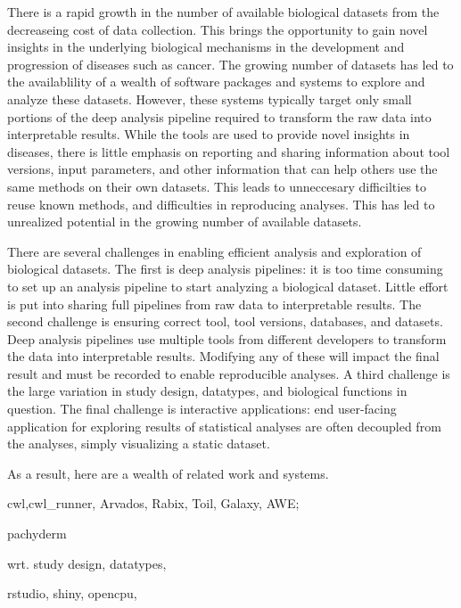 
There is a rapid growth in the number of available biological datasets from the
decreaseing cost of data collection. This brings the opportunity to gain novel
insights in the underlying biological mechanisms in the development and
progression of diseases such as cancer. The growing number of datasets has led
to the availablility of a wealth of software packages and systems to explore and
analyze these datasets. However, these systems typically target only small
portions of the deep analysis pipeline required to transform the raw data into
interpretable results. While the tools are used to provide novel insights in
diseases, there is little emphasis on reporting and sharing information about
tool versions, input parameters, and other information that can help others use
the same methods on their own datasets. This leads to unneccesary difficilties
to reuse known methods, and difficulties in reproducing analyses.  This has led
to unrealized potential in the growing number of available datasets. 


There are several challenges in enabling efficient analysis and exploration of
biological datasets. 
The first is deep analysis pipelines: it is too time consuming to set up an
analysis pipeline to start analyzing a biological dataset. Little effort is put
into sharing full pipelines from raw data to interpretable results.
The second challenge is ensuring correct tool, tool versions, databases, and
datasets. Deep analysis pipelines use multiple tools from different developers
to transform the data into interpretable results. Modifying any of these will
impact the final result and must be recorded to enable reproducible analyses. 
A third challenge is the large variation in study design, datatypes,
and biological functions in question.
The final challenge is interactive applications: end user-facing application
for exploring results of statistical analyses are often decoupled from the
analyses, simply visualizing a static dataset.  

As a result, here are a wealth of related work and systems. 
\begin{enumerate*}[label=(\roman*)]
    \item cwl,cwl\_runner, Arvados, Rabix, Toil, Galaxy,
        AWE;   
    \item pachyderm
    \item wrt. study design, datatypes, 
    \item rstudio, shiny, opencpu,
\end{enumerate*} 



